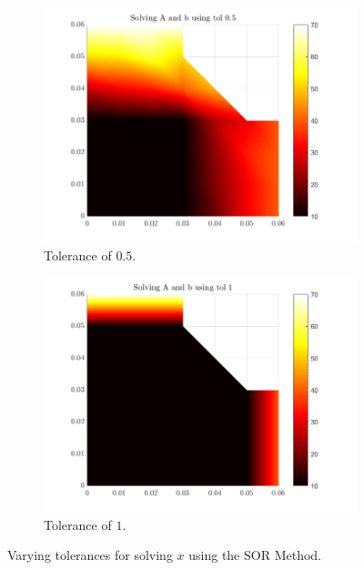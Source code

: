 \documentclass[12pt,a4paper]{article}
\begin{document}
\begin{figure}
\begin{subfigure}[b]{0.4\textwidth}
		\includegraphics[width=\linewidth]{images/Comparisontol0-5.png}
		\caption{Tolerance of $0.5$.}
		\label{fig:tol0.5}
	\end{subfigure}
	\hfill
	\begin{subfigure}[b]{0.4\textwidth}
		\centering
		\includegraphics[width=\linewidth]{images/Comparisontol1.png}
		\caption{Tolerance of $1$.}
		\label{fig:tol1}
	\end{subfigure}
	\caption{Varying tolerances for solving $x$ using the SOR Method.}
    \label{fig:tolerance}
\end{figure}
 
\end{document}
